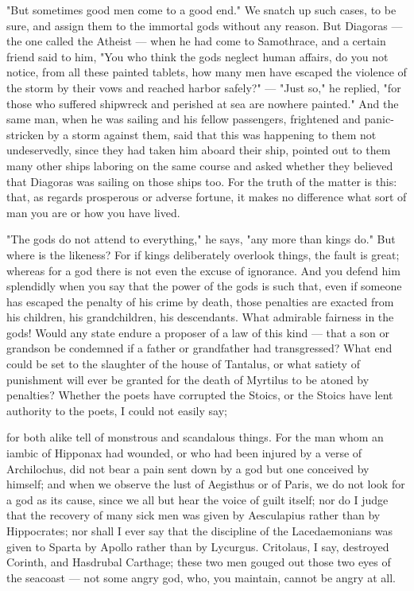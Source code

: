  "But sometimes good men come to a good end." We snatch up such cases, to be sure, and assign them to the immortal gods without any reason. But Diagoras — the one called the Atheist — when he had come to Samothrace, and a certain friend said to him, "You who think the gods neglect human affairs, do you not notice, from all these painted tablets, how many men have escaped the violence of the storm by their vows and reached harbor safely?" — "Just so," he replied, "for those who suffered shipwreck and perished at sea are nowhere painted." And the same man, when he was sailing and his fellow passengers, frightened and panic-stricken by a storm against them, said that this was happening to them not undeservedly, since they had taken him aboard their ship, pointed out to them many other ships laboring on the same course and asked whether they believed that Diagoras was sailing on those ships too. For the truth of the matter is this: that, as regards prosperous or adverse fortune, it makes no difference what sort of man you are or how you have lived.

 "The gods do not attend to everything," he says, "any more than kings do." But where is the likeness? For if kings deliberately overlook things, the fault is great; whereas for a god there is not even the excuse of ignorance. And you defend him splendidly when you say that the power of the gods is such that, even if someone has escaped the penalty of his crime by death, those penalties are exacted from his children, his grandchildren, his descendants. What admirable fairness in the gods! Would any state endure a proposer of a law of this kind — that a son or grandson be condemned if a father or grandfather had transgressed? What end could be set to the slaughter of the house of Tantalus, or what satiety of punishment will ever be granted for the death of Myrtilus to be atoned by penalties? Whether the poets have corrupted the Stoics, or the Stoics have lent authority to the poets, I could not easily say;

 for both alike tell of monstrous and scandalous things. For the man whom an iambic of Hipponax had wounded, or who had been injured by a verse of Archilochus, did not bear a pain sent down by a god but one conceived by himself; and when we observe the lust of Aegisthus or of Paris, we do not look for a god as its cause, since we all but hear the voice of guilt itself; nor do I judge that the recovery of many sick men was given by Aesculapius rather than by Hippocrates; nor shall I ever say that the discipline of the Lacedaemonians was given to Sparta by Apollo rather than by Lycurgus. Critolaus, I say, destroyed Corinth, and Hasdrubal Carthage; these two men gouged out those two eyes of the seacoast — not some angry god, who, you maintain, cannot be angry at all.

